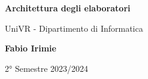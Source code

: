 \begin{titlepage}
	\begin{center}
		\vspace*{1cm}

		\Huge
		\textbf{Architettura degli elaboratori}

		\vspace{0.5cm}
		\LARGE
		UniVR - Dipartimento di Informatica

		\vspace{1.5cm}

		\textbf{Fabio Irimie}

		\vfill


		\vspace{0.8cm}


		2° Semestre 2023/2024

	\end{center}
\end{titlepage}
